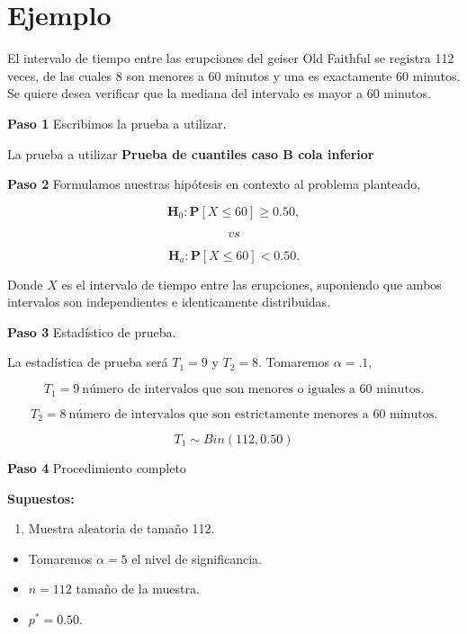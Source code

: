 \documentclass[
  a4paper,
  oneside,
  openany]{book}
\providecommand{\tightlist}{%
  \setlength{\itemsep}{0pt}\setlength{\parskip}{0pt}}
\begin{document}
\hypertarget{ejemplo-1}{%
\section{Ejemplo}\label{ejemplo-1}}

El intervalo de tiempo entre las erupciones del geiser Old Faithful se registra 112 veces, de las cuales 8 son menores a 60 minutos y una es exactamente 60 minutos. Se quiere desea verificar que la mediana del intervalo es mayor a 60 minutos.

\textbf{Paso 1} Escribimos la prueba a utilizar.

La prueba a utilizar \textbf{Prueba de cuantiles caso B cola inferior}

\textbf{Paso 2} Formulamos nuestras hipótesis en contexto al problema planteado,

\[\textbf{H}_0: \mathbf{P}[X \leq 60]\geq 0.50,\]

\[vs\]

\[\textbf{H}_a:  \mathbf{P}[X \leq 60]<0.50.\]

Donde \(X\) es el intervalo de tiempo entre las erupciones, suponiendo que ambos intervalos son independientes e identicamente distribuidas.

\textbf{Paso 3} Estadístico de prueba.

La estadística de prueba será \(T_1=9\) y \(T_2=8\). Tomaremos \(\alpha=.1,\)

\[T_{1}=9 \ \mbox{número  de  intervalos que  son menores o iguales  a 60 minutos.}\]

\[T_{2}=8 \ \mbox{número  de  intervalos que  son estrictamente menores a 60 minutos.}\]

\[T_{1}\sim Bin(112,0.50)\]

\textbf{Paso 4} Procedimiento completo

\textbf{Supuestos:}

\begin{enumerate}
\def\labelenumi{\arabic{enumi}.}
\tightlist
\item
  Muestra aleatoria de tamaño 112.
\end{enumerate}

\begin{itemize}
\item
  Tomaremos \(\alpha = 5%
  \) el nivel de significancia.
\item
  \(n = 112\) tamaño de la muestra.
\item
  \(p^* = 0.50.\)
\end{itemize}
\end{document}
